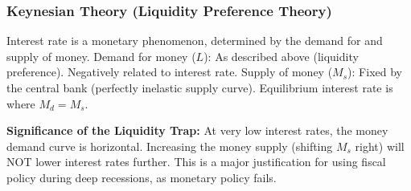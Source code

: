 \documentclass[11pt, a4paper, twoside]{book}
\begin{document}
\subsubsection{Keynesian Theory (Liquidity Preference Theory)}

Interest rate is a monetary phenomenon, determined by the demand for and supply of money. Demand for money ($L$): As described above (liquidity preference). Negatively related to interest rate. Supply of money ($M_s$): Fixed by the central bank (perfectly inelastic supply curve). Equilibrium interest rate is where $M_d = M_s$.

\begin{coreidea}
\textbf{Significance of the Liquidity Trap:} At very low interest rates, the money demand curve is horizontal. Increasing the money supply (shifting $M_s$ right) will NOT lower interest rates further. This is a major justification for using fiscal policy during deep recessions, as monetary policy fails.
\end{coreidea}

\end{document}
